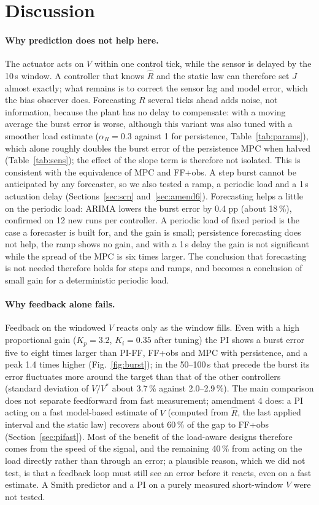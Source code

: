 \documentclass[smallextended]{svjour3}
\begin{document}
\section{Discussion}\label{sec:discussion}
\paragraph{Why prediction does not help here.}
The actuator acts on $V$ within one control tick, while the sensor is delayed by the 10\,s window. A controller that knows $\hat R$ and the static law can therefore set $J$ almost
exactly; what remains is to correct the sensor lag and model error, which the bias observer does. Forecasting $R$ several ticks ahead adds noise, not information, because the plant has no
delay to compensate: with a moving average the burst error is worse, although this variant was also tuned with a smoother load estimate ($\alpha_R=0.3$ against 1 for persistence, Table~\ref{tab:params}), which alone roughly doubles the burst error of the persistence MPC when halved (Table~\ref{tab:sens}); the effect of the slope term is therefore not isolated. This is consistent with the equivalence of MPC and FF+obs. A step burst cannot be anticipated by any forecaster, so we also tested a ramp, a periodic load and a 1\,s actuation delay (Sections~\ref{sec:scn} and~\ref{sec:amend6}). Forecasting helps a little on the periodic load: ARIMA lowers the burst error by 0.4 pp (about 18\,\%), confirmed on 12 new runs per controller. A periodic load of fixed period is the case a forecaster is built for, and the gain is small; persistence forecasting does not help, the ramp shows no gain, and with a 1\,s delay the gain is not significant while the spread of the MPC is six times larger. The conclusion that forecasting is not needed therefore holds for steps and ramps, and becomes a conclusion of small gain for a deterministic periodic load.
\paragraph{Why feedback alone fails.}
Feedback on the windowed $V$ reacts only as the window fills. Even with a high proportional gain ($K_p=3.2$, $K_i=0.35$ after tuning) the PI shows a
burst error five to eight times larger than PI-FF, FF+obs and MPC with persistence, and a peak 1.4 times higher (Fig.~\ref{fig:burst}); in the 50--100\,s that precede the burst its error fluctuates more around the target than that of the other controllers (standard deviation of $V/V^*$ about 3.7\,\% against 2.0--2.9\,\%). The main comparison does not separate feedforward from fast measurement; amendment 4 does: a PI acting on a fast model-based estimate of $V$ (computed from $\hat R$, the last applied interval and the static law) recovers about 60\,\% of the gap to FF+obs (Section~\ref{sec:pifast}). Most of the benefit of the load-aware designs therefore comes from the speed of the signal, and the remaining 40\,\% from acting on the load directly rather than through an error; a plausible reason, which we did not test, is that a feedback loop must still see an error before it reacts, even on a fast estimate. A Smith predictor and a PI on a purely measured short-window $V$ were not tested.
\end{document}
